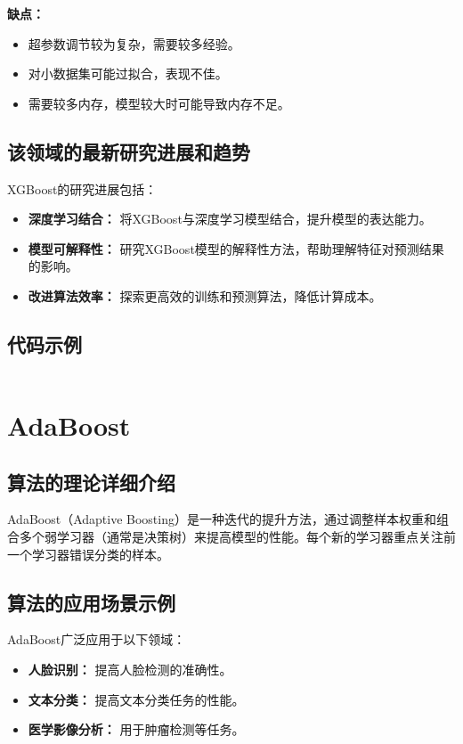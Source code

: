 \textbf{缺点：}
\begin{itemize}
    \item 超参数调节较为复杂，需要较多经验。
    \item 对小数据集可能过拟合，表现不佳。
    \item 需要较多内存，模型较大时可能导致内存不足。
\end{itemize}

\subsection*{该领域的最新研究进展和趋势}
XGBoost的研究进展包括：
\begin{itemize}
    \item \textbf{深度学习结合：} 将XGBoost与深度学习模型结合，提升模型的表达能力。
    \item \textbf{模型可解释性：} 研究XGBoost模型的解释性方法，帮助理解特征对预测结果的影响。
    \item \textbf{改进算法效率：} 探索更高效的训练和预测算法，降低计算成本。
\end{itemize}
\subsection*{代码示例}
\begin{lstlisting}

\end{lstlisting}


\section{AdaBoost}
\subsection*{算法的理论详细介绍}
AdaBoost（Adaptive Boosting）是一种迭代的提升方法，通过调整样本权重和组合多个弱学习器（通常是决策树）来提高模型的性能。每个新的学习器重点关注前一个学习器错误分类的样本。

\subsection*{算法的应用场景示例}
AdaBoost广泛应用于以下领域：
\begin{itemize}
    \item \textbf{人脸识别：} 提高人脸检测的准确性。
    \item \textbf{文本分类：} 提高文本分类任务的性能。
    \item \textbf{医学影像分析：} 用于肿瘤检测等任务。
\end{itemize}

